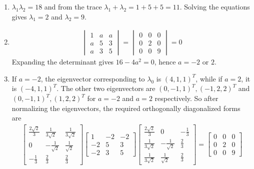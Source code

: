 \begin{Answer}
\begin{enumerate}[label=(\alph*)]
\item $\lambda_1\lambda_2 = 18$ and from the trace $\lambda_1 + \lambda_2 = 1 + 5 + 5 = 11$. Solving the equations gives $\lambda_1 = 2$ and $\lambda_2 = 9$.
\item \begin{align*}
\begin{vmatrix}
1 & a & a\\
a & 5 & 3\\
a & 3 & 5
\end{vmatrix}
=
\begin{vmatrix}
0 & 0 & 0\\
0 & 2 & 0\\
0 & 0 & 9 
\end{vmatrix}
= 0
\end{align*}
Expanding the determinant gives $16 - 4a^2 = 0$, hence $a = -2$ or $2$.
\item If $a = -2$, the eigenvector corresponding to $\lambda_0$ is $(4,1,1)^T$, while if $a = 2$, it is $(-4,1,1)^T$. The other two eigenvectors are $(0,-1,1)^T, (-1,2,2)^T$ and $(0,-1,1)^T, (1,2,2)^T$ for $a=-2$ and $a=2$ respectively. So after normalizing the eigenvectors, the required orthogonally diagonalized forms are
\begin{align*}
\begin{bmatrix}
\frac{2\sqrt{2}}{3}&\frac{1}{3\sqrt{2}}&\frac{1}{3\sqrt{2}}\\ 
0&-\frac{1}{\sqrt{2}}&\frac{1}{\sqrt{2}}\\ 
-\frac{1}{3}&\frac{2}{3}&\frac{2}{3}
\end{bmatrix}
\begin{bmatrix}
1 & -2 & -2\\
-2 & 5 & 3\\
-2 & 3 & 5
\end{bmatrix}
\begin{bmatrix}
\frac{2\sqrt{2}}{3}&0&-\frac{1}{3}\\ 
\frac{1}{3\sqrt{2}}&-\frac{1}{\sqrt{2}}&\frac{2}{3}\\ 
\frac{1}{3\sqrt{2}}&\frac{1}{\sqrt{2}}&\frac{2}{3}
\end{bmatrix}
=
\begin{bmatrix}
0 & 0 & 0 \\
0 & 2 & 0 \\
0 & 0 & 9
\end{bmatrix}
\end{align*}

\end{enumerate}
\end{Answer}
